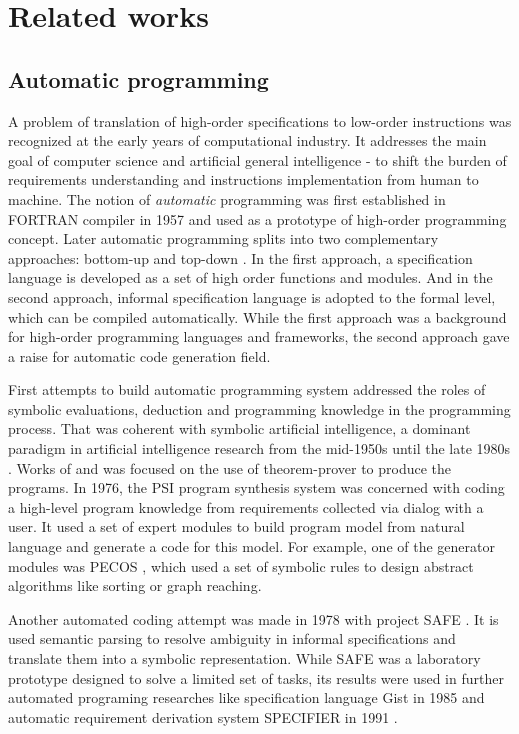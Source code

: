 \chapter{Related works}
\label{Chapter2}

\section{Automatic programming}
A problem of translation of high-order specifications to low-order instructions was recognized at the early years of computational industry. It addresses the main goal of computer science and artificial general intelligence - to shift the burden of requirements understanding and instructions implementation from human to machine. The notion of \emph{automatic} programming was first established in FORTRAN compiler in 1957 \parencite{backus1957fortran} and used as a prototype of high-order programming concept.  Later automatic programming splits into two complementary approaches: bottom-up and top-down \parencite{Balzer1985}. In the first approach, a specification language is developed as a set of high order functions and modules. And in the second approach, informal specification language is adopted to the formal level, which can be compiled automatically. While the first approach was a background for high-order programming languages and frameworks, the second approach gave a raise for automatic code generation field. 

First attempts to build automatic programming system addressed the roles of symbolic evaluations, deduction and programming knowledge in the programming process. That was coherent with symbolic artificial intelligence, a dominant paradigm in artificial intelligence research from the mid-1950s until the late 1980s \parencite{haugeland1989artificial}. Works of \cite{green1969application} and \cite{Lee1974} was focused on the use of theorem-prover to produce the programs. In 1976, the PSI program synthesis system \parencite{green1976design, green1977summary} was concerned with coding a high-level program knowledge from requirements collected via dialog with a user. It used a set of expert modules to build program model from natural language and generate a code for this model. For example, one of the generator modules was PECOS \parencite{barstow1979experiment}, which used a set of symbolic rules to design abstract algorithms like sorting or graph reaching. 

Another automated coding attempt was made in 1978 with project SAFE \parencite{balzer1978informality}. It is used semantic parsing to resolve ambiguity in informal specifications and translate them into a symbolic representation. While SAFE was a laboratory prototype designed to solve a limited set of tasks, its results were used in further automated programing researches like specification language Gist \parencite{Balzer1985} in 1985 and automatic requirement derivation system SPECIFIER in 1991 \parencite{Miriyala1991}.

